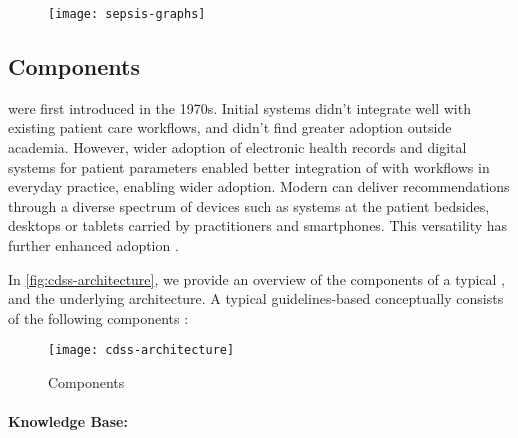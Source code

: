 \begin{figure}[t]
  \centering
  \texttt{[image: sepsis-graphs]}
  \label{fig:sepsis-graphs-view}
\end{figure}


\subsection{\CDSS{} Components}\label{sec:cdss-components}

\CDSSs{} were first introduced in the 1970s. Initial systems
didn't integrate well with existing patient care workflows, and
didn't find greater adoption outside academia. However,
wider adoption of electronic health records and digital systems for
patient parameters enabled better integration of \CDSSs{} with
workflows in everyday practice, enabling wider adoption.
Modern \CDSS{} can deliver recommendations
through a diverse spectrum of devices such
as systems at the patient bedsides, desktops or tablets carried by
practitioners and smartphones. This versatility
has further enhanced \CDSSs{} adoption \cite{SuttonNature20}.

In \autoref{fig:cdss-architecture}, we provide an overview
of the components of a typical \CDSS{}, and the underlying architecture.
A typical guidelines-based \CDSS{} conceptually consists of the
following components \cite{SuttonNature20}:

\begin{figure}[h]
  \centering
  \texttt{[image: cdss-architecture]}
  \caption{\CDSS{} Components}\label{fig:cdss-architecture}
\end{figure}


\paragraph{Knowledge Base:}

